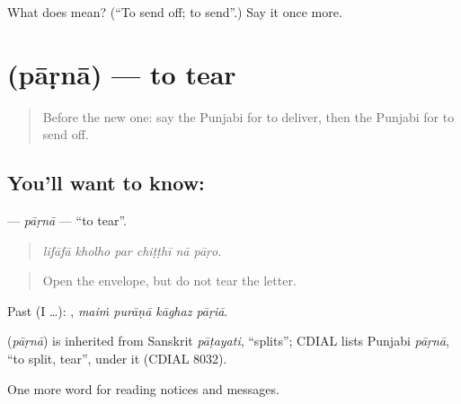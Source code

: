 \begin{tcolorbox}[breakable,colback=teal!4,colframe=teal!35!black,title={Before you move on}]
What does  mean? (\textquotedblleft{}To send off; to send\textquotedblright{}.) Say it once more.
\end{tcolorbox}
\section[\texorpdfstring{\pa{ਪਾੜਨਾ} (pāṛnā)}{ਪਾੜਨਾ (pāṛnā)}]{ (pāṛnā) — to tear}

\label{lesson:PA-C256-parna}



\begin{quote}
Before the new one: say the Punjabi for to deliver, then the Punjabi for to send off.
\end{quote}

\subsection*{You'll want to know: }
\textbf{} — \emph{pāṛnā} — \textquotedblleft{}to tear\textquotedblright{}.

\begin{quote}
     
\end{quote}

\begin{quote}
\emph{lifāfā kholho par chiṭṭhī nā pāṛo.}
\end{quote}

\begin{quote}
Open the envelope, but do not tear the letter.
\end{quote}

Past (I …):    , \emph{maiṁ purāṇā kāghaz pāṛiā}.

\begin{cousinweb}
\textbf{} (\emph{pāṛnā}) is inherited from Sanskrit \emph{pāṭayati}, \textquotedblleft{}splits\textquotedblright{}; CDIAL lists Punjabi \emph{pāṛnā}, \textquotedblleft{}to split, tear\textquotedblright{}, under it (CDIAL 8032).
\end{cousinweb}

\begin{grammarlens}[title={What you've built}]
One more word for reading notices and messages.
\end{grammarlens}

